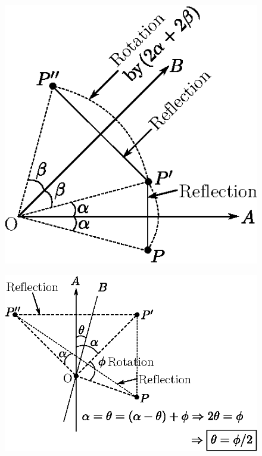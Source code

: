 \begin{itemize}
\begin{minipage}[c]{5.3cm}
\begin{figure}[H]
\centering
\includegraphics[scale=.8]{images/lecture10/fig2.eps}
\end{figure}
\end{minipage}
\qquad
\begin{minipage}[c]{5.3cm}
\begin{figure}[H]
\centering
\includegraphics[scale=.8]{images/lecture10/fig3.eps}
\end{figure}
\end{minipage}
\end{itemize}

